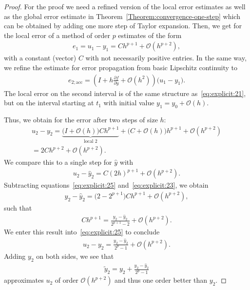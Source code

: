 \begin{proof}
  For the proof we need a refined version of the local error estimates
  as well as the global error estimate in
  Theorem~\eqref{Theorem:convergence-one-step} which can be obtained by
  adding one more step of Taylor expansion. Then, we get for the local
  error of a method of order $p$ estimates of the form
  \begin{gather}
    \label{eq:explicit:21}
    e_1 = u_1 - y_1 = C h^{p+1} + \mathcal O(h^{p+2}),
  \end{gather}
  with a constant (vector) $C$ with not necessarily positive
  entries. In the same way, we refine the estimate for error
  propagation from basic Lipschitz continuity to
  \begin{gather}
    \label{eq:explicit:22}
    e_{2;\text{acc}} = \left(I + h \frac{\partial f}{\partial y} +
      \mathcal O(h^2)\right) \bigl(u_1-y_1).
  \end{gather}
  The local error on the second interval is of the same structure
  as~\eqref{eq:explicit:21}, but on the interval starting at $t_1$
  with initial value $y_1 = y_0 + \mathcal O(h)$.

  Thus, we obtain for the error after two steps of size $h$:
  \begin{multline}
    \label{eq:explicit:25}
    u_2-y_2
    = \underbrace{\bigl(I+\mathcal O(h)\bigr) C
      h^{p+1}}_{\text{local 2}}
    + \bigl(C+\mathcal O(h)\bigr) h^{p+1} + \mathcal
      O(h^{p+2})
    \\  = 2C h^{p+2} + \mathcal O(h^{p+2}).
  \end{multline}
  We compare this to a single step for $\hat y$ with
  \begin{gather}
    \label{eq:explicit:23}
    u_2 - \hat y_2 = C (2h)^{p+1} + \mathcal O(h^{p+2}).
  \end{gather}
  Subtracting equations~\eqref{eq:explicit:25}
  and~\eqref{eq:explicit:23}, we obtain
  \begin{gather*}
    y_2 - \hat y_2 = \bigl(2-2^{p+1}\bigr)C h^{p+1} + \mathcal O(h^{p+2}),
  \end{gather*}
  such that
  \begin{gather}
    \label{eq:explicit:26}
    C h^{p+1} = \frac{y_2 - \hat y_2}{2^{p+1}-2} + \mathcal O(h^{p+2}).
  \end{gather}
  We enter this result into~\eqref{eq:explicit:25} to conclude
  \begin{gather}
    \label{eq:explicit:27}
    u_2 - y_2 = \frac{y_2 - \hat y_2}{2^{p}-1} + \mathcal O(h^{p+2}).
  \end{gather}
  Adding $y_2$ on both sides, we see that
  \begin{gather}
    \label{eq:explicit:28}
    \tilde y_2 = y_2 + \frac{y_2 - \hat y_2}{2^{p}-1}
  \end{gather}
  approximates $u_2$ of order $\mathcal O(h^{p+2})$ and thus one order
  better than $y_2$.
\end{proof}

